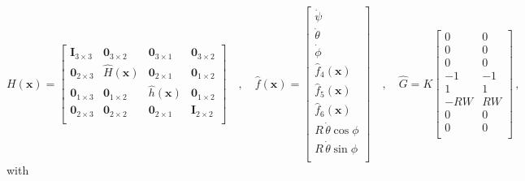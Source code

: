 \documentclass[a4paper]{article}
\renewcommand{\vec}[1]{\mathbf{#1}} %
\newcommand{\vx}{\vec{x}}
\newcommand{\hH}{\widehat{H}}
\newcommand{\hh}{\widehat{h}}
\newcommand{\hf}{\widehat{f}}
\newcommand{\hG}{\widehat{G}}
\newcommand{\I}{\textbf{I}} %
\newcommand{\Z}{\vec{0}} %
\newcommand{\pitch}{\psi}
\newcommand{\yaw}{\phi}
\newcommand{\roll}{\theta}
\begin{document}
\begin{equation}
   H(\vx)
   = \left[ \begin{array}{cccc}
     \I_{3 \times 3} & \Z_{3 \times 2}  & \Z_{3 \times 1}  & \Z_{3 \times 2} \\
     \Z_{2 \times 3} & \hH(\vx)         & \Z_{2 \times 1}  & \Z_{1 \times 2} \\
     \Z_{1 \times 3} & \Z_{1 \times 2}  & \hh(\vx)         & \Z_{1 \times 2} \\
     \Z_{2 \times 3} & \Z_{2 \times 2}  & \Z_{2 \times 1}  & \I_{2 \times 2} \\
     \end{array} \right]
   \quad , \quad
   \hf(\vx) = \left[ \begin{array}{c}
                     \dot\pitch \\
                     \dot\roll \\
                     \dot\yaw \\
                     \hf_4(\vx) \\
                     \hf_5(\vx) \\
                     \hf_6(\vx) \\
                     R \, \dot\roll \cos\yaw \\
                     R \, \dot\roll \sin\yaw \\
                     \end{array} \right]
    \quad , \quad
    \hG = K \left[ \begin{array}{cc}
                   0    & 0 \\
                   0    & 0 \\
                   0    & 0 \\
                   -1   & -1 \\
                   1    & 1 \\
                   -R W & R W \\
                   0    & 0 \\
                   0    & 0 \\
                   \end{array} \right]
    \,,
\end{equation}
with
\end{document}
